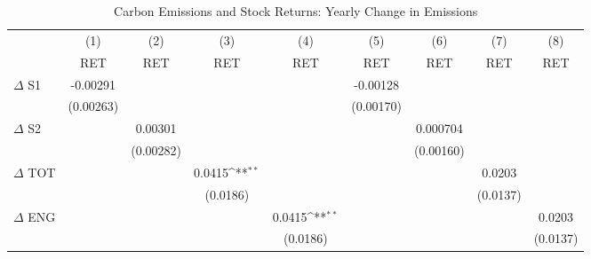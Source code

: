 \begin{table}[htbp]\centering
\def\sym#1{\ifmmode^{#1}\else\(^{#1}\)\fi}
\caption{Carbon Emissions and Stock Returns: Yearly Change in Emissions}
\begin{tabular}{l*{8}{c}}
\hline\hline
                    &\multicolumn{1}{c}{(1)}&\multicolumn{1}{c}{(2)}&\multicolumn{1}{c}{(3)}&\multicolumn{1}{c}{(4)}&\multicolumn{1}{c}{(5)}&\multicolumn{1}{c}{(6)}&\multicolumn{1}{c}{(7)}&\multicolumn{1}{c}{(8)}\\
                    &\multicolumn{1}{c}{RET}&\multicolumn{1}{c}{RET}&\multicolumn{1}{c}{RET}&\multicolumn{1}{c}{RET}&\multicolumn{1}{c}{RET}&\multicolumn{1}{c}{RET}&\multicolumn{1}{c}{RET}&\multicolumn{1}{c}{RET}\\
\hline
$\Delta$ S1         &    -0.00291         &                     &                     &                     &    -0.00128         &                     &                     &                     \\
                    &   (0.00263)         &                     &                     &                     &   (0.00170)         &                     &                     &                     \\
$\Delta$ S2         &                     &     0.00301         &                     &                     &                     &    0.000704         &                     &                     \\
                    &                     &   (0.00282)         &                     &                     &                     &   (0.00160)         &                     &                     \\
$\Delta$ TOT        &                     &                     &      0.0415\sym{**} &                     &                     &                     &      0.0203         &                     \\
                    &                     &                     &    (0.0186)         &                     &                     &                     &    (0.0137)         &                     \\
$\Delta$ ENG        &                     &                     &                     &      0.0415\sym{**} &                     &                     &                     &      0.0203         \\
                    &                     &                     &                     &    (0.0186)         &                     &                     &                     &    (0.0137)         \\

\end{tabular}
\end{table}
